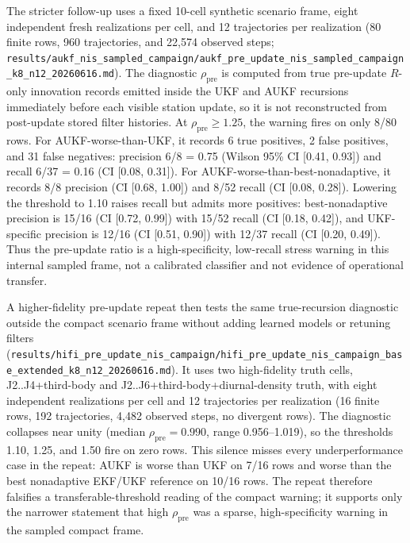 \documentclass{article}
\begin{document}
The stricter follow-up uses a fixed 10-cell synthetic scenario frame, eight independent fresh realizations per cell, and 12 trajectories per realization (80 finite rows, 960 trajectories, and 22,574 observed steps; \nolinkurl{results/aukf_nis_sampled_campaign/aukf_pre_update_nis_sampled_campaign_k8_n12_20260616.md}). The diagnostic \(\rho_{\mathrm{pre}}\) is computed from true pre-update \(R\)-only innovation records emitted inside the UKF and AUKF recursions immediately before each visible station update, so it is not reconstructed from post-update stored filter histories. At \(\rho_{\mathrm{pre}}\geq1.25\), the warning fires on only 8/80 rows. For AUKF-worse-than-UKF, it records 6 true positives, 2 false positives, and 31 false negatives: precision 6/8 = 0.75 (Wilson 95\% CI [0.41, 0.93]) and recall 6/37 = 0.16 (CI [0.08, 0.31]). For AUKF-worse-than-best-nonadaptive, it records 8/8 precision (CI [0.68, 1.00]) and 8/52 recall (CI [0.08, 0.28]). Lowering the threshold to 1.10 raises recall but admits more positives: best-nonadaptive precision is 15/16 (CI [0.72, 0.99]) with 15/52 recall (CI [0.18, 0.42]), and UKF-specific precision is 12/16 (CI [0.51, 0.90]) with 12/37 recall (CI [0.20, 0.49]). Thus the pre-update ratio is a high-specificity, low-recall stress warning in this internal sampled frame, not a calibrated classifier and not evidence of operational transfer.

A higher-fidelity pre-update repeat then tests the same true-recursion diagnostic outside the compact scenario frame without adding learned models or retuning filters (\nolinkurl{results/hifi_pre_update_nis_campaign/hifi_pre_update_nis_campaign_base_extended_k8_n12_20260616.md}). It uses two high-fidelity truth cells, J2..J4+third-body and J2..J6+third-body+diurnal-density truth, with eight independent realizations per cell and 12 trajectories per realization (16 finite rows, 192 trajectories, 4,482 observed steps, no divergent rows). The diagnostic collapses near unity (median \(\rho_{\mathrm{pre}}=0.990\), range 0.956--1.019), so the thresholds 1.10, 1.25, and 1.50 fire on zero rows. This silence misses every underperformance case in the repeat: AUKF is worse than UKF on 7/16 rows and worse than the best nonadaptive EKF/UKF reference on 10/16 rows. The repeat therefore falsifies a transferable-threshold reading of the compact warning; it supports only the narrower statement that high \(\rho_{\mathrm{pre}}\) was a sparse, high-specificity warning in the sampled compact frame.
\end{document}
